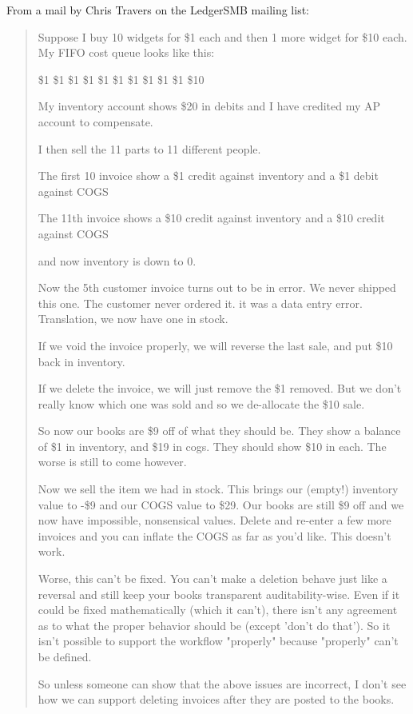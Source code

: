 From a mail by Chris Travers on the LedgerSMB mailing list:

\begin{quote}
Suppose I buy 10 widgets for \$1 each and then 1 more widget for \$10 each.  My FIFO cost queue looks like this:

\$1 \$1 \$1 \$1 \$1 \$1 \$1 \$1 \$1 \$1 \$10

My inventory account shows \$20 in debits and I have credited my AP account to compensate.

I then sell the 11 parts to 11 different people.

The first 10 invoice show a \$1 credit against inventory and a \$1 debit against COGS

The 11th invoice shows a \$10 credit against inventory and a \$10 credit against COGS 

and now inventory is down to 0.

Now the 5th customer invoice turns out to be in error. We never shipped this one. The customer never ordered it.  it was a data entry error.  Translation, we now have one in stock.

If we void the invoice properly, we will reverse the last sale, and put \$10 back in inventory. 

If we delete the invoice, we will just remove the \$1 removed.  But we don't really know which one was sold and so we de-allocate the \$10 sale.

So now our books are \$9 off of what they should be. They show a balance of \$1 in inventory, and \$19 in cogs. They should show \$10 in each.  The worse is still to come however.

Now we sell the item we had in stock.  This brings our (empty!) inventory value to -\$9 and our COGS value to \$29.  Our books are still \$9 off and we now have impossible, nonsensical values.  Delete and re-enter a few more invoices and you can inflate the COGS as far as you'd like.   This doesn't work.

Worse, this can't be fixed.  You can't make a deletion behave just like a reversal and still keep your books transparent auditability-wise.  Even if it could be fixed mathematically (which it can't), there isn't any agreement as to what the proper behavior should be (except 'don't do that').  So it isn't possible to support the workflow "properly" because "properly" can't be defined.

So unless someone can show that the above issues are incorrect, I don't see how we can support deleting invoices after they are posted to the books.


\end{quote}
